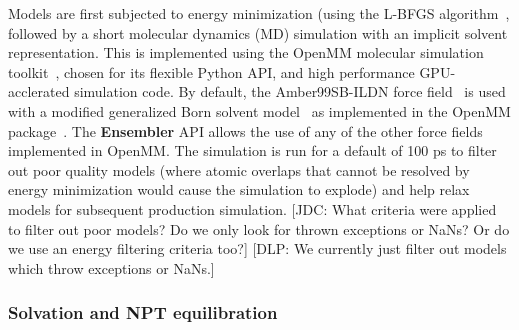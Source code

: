 \documentclass[aps,pre,twocolumn,nofootinbib,superscriptaddress,linenumbers]{revtex4-1}
\begin{document}
Models are first subjected to energy minimization (using the L-BFGS algorithm~\cite{lbfgs}, followed by a short molecular dynamics (MD) simulation with an implicit solvent representation.
This is implemented using the OpenMM molecular simulation toolkit~\cite{eastman:jctc:2012:openmm}, chosen for its flexible Python API, and high performance GPU-acclerated simulation code.
By default, the Amber99SB-ILDN force field~\cite{amber99sb-ildn} is used with a modified generalized Born solvent model~\cite{gbsa-obc1} as implemented in the OpenMM package~\cite{eastman:jctc:2012:openmm}.
The {\bf Ensembler} API allows the use of any of the other force fields implemented in OpenMM.
The simulation is run for a default of 100 ps to filter out poor quality models (where atomic overlaps that cannot be resolved by energy minimization would cause the simulation to explode) and help relax models for subsequent production simulation.
{\color{red}[JDC: What criteria were applied to filter out poor models?  Do we only look for thrown exceptions or NaNs?  Or do we use an energy filtering criteria too?]}
{\color{blue}[DLP: We currently just filter out models which throw exceptions or NaNs.]}

\subsubsection*{Solvation and NPT equilibration}
\end{document}
